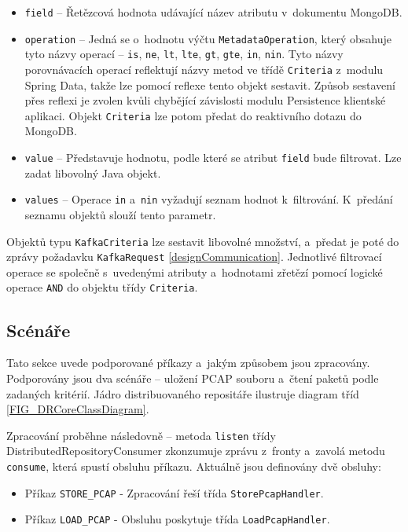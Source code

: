 \begin{itemize}
    \item \texttt{field} -- Řetězcová hodnota udávající název atributu v~dokumentu MongoDB.
    
    \item \texttt{operation} -- Jedná se o~hodnotu výčtu \texttt{MetadataOperation}, který obsahuje tyto názvy operací -- \texttt{is}, \texttt{ne}, \texttt{lt}, \texttt{lte}, \texttt{gt}, \texttt{gte}, \texttt{in}, \texttt{nin}. Tyto názvy porovnávacích operací reflektují názvy metod ve třídě \texttt{Criteria} z~modulu Spring Data, takže lze pomocí reflexe tento objekt sestavit. Způsob sestavení přes reflexi je zvolen kvůli chybějící závislosti modulu Persistence klientské aplikaci.
    Objekt \texttt{Criteria} lze potom předat do reaktivního dotazu do MongoDB.
    
    \item \texttt{value} -- Představuje hodnotu, podle které se atribut \texttt{field} bude filtrovat. Lze zadat libovolný Java objekt.
    
    \item \texttt{values} -- Operace \texttt{in} a~\texttt{nin} vyžadují seznam hodnot k~filtrování. K~předání seznamu objektů slouží tento parametr.
\end{itemize}

\noindent Objektů typu \texttt{KafkaCriteria} lze sestavit libovolné množství, a~předat je poté do zprávy požadavku \texttt{KafkaRequest} \ref{designCommunication}. Jednotlivé filtrovací operace se společně s~uvedenými atributy a~hodnotami zřetězí pomocí logické operace \texttt{AND} do objektu třídy \texttt{Criteria}.

\subsection{Scénáře}
Tato sekce uvede podporované příkazy a~jakým způsobem jsou zpracovány. Podporovány jsou dva scénáře -- uložení PCAP souboru a~čtení paketů podle zadaných kritérií. Jádro distribuovaného repositáře ilustruje diagram tříd \ref{FIG_DRCoreClassDiagram}.

Zpracování proběhne následovně -- metoda \texttt{listen} třídy DistributedRepositoryConsumer zkonzumuje zprávu z~fronty a~zavolá metodu \texttt{consume}, která spustí obsluhu příkazu. Aktuálně jsou definovány dvě obsluhy:

\begin{itemize}
    \item Příkaz \texttt{STORE\_PCAP} - Zpracování řeší třída \texttt{StorePcapHandler}.
    \item Příkaz \texttt{LOAD\_PCAP} - Obsluhu poskytuje třída \texttt{LoadPcapHandler}. 
\end{itemize}

